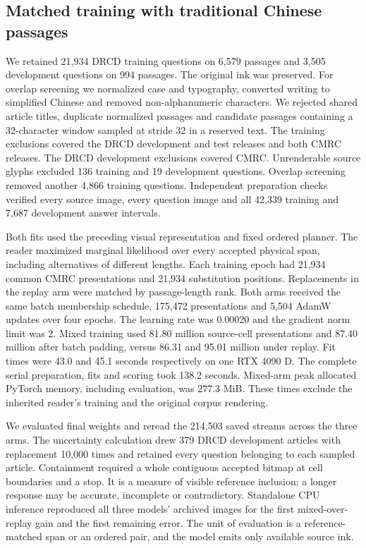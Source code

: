 \documentclass[12pt,a4paper]{article}
\providecommand{\DIFadd}[1]{{\protect\color{blue} \sf #1}} %
\begin{document}
\subsection*{\DIFadd{Matched training with traditional Chinese passages}}
\DIFadd{We retained 21,934 DRCD training questions on 6,579 passages and 3,505 development questions on 994 passages. The original ink was preserved. For overlap screening we normalized case and typography, converted writing to simplified Chinese and removed non-alphanumeric characters. We rejected shared article titles, duplicate normalized passages and candidate passages containing a 32-character window sampled at stride 32 in a reserved text. The training exclusions covered the DRCD development and test releases and both CMRC releases. The DRCD development exclusions covered CMRC. Unrenderable source glyphs excluded 136 training and 19 development questions. Overlap screening removed another 4,866 training questions. Independent preparation checks verified every source image, every question image and all 42,339 training and 7,687 development answer intervals.
}

\DIFadd{Both fits used the preceding visual representation and fixed ordered planner. The reader maximized marginal likelihood over every accepted physical span, including alternatives of different lengths. Each training epoch had 21,934 common CMRC presentations and 21,934 substitution positions. Replacements in the replay arm were matched by passage-length rank. Both arms received the same batch membership schedule, 175,472 presentations and 5,504 AdamW updates over four epochs. The learning rate was 0.00020 and the gradient norm limit was 2. Mixed training used 81.80 million source-cell presentations and 87.40 million after batch padding, versus 86.31 and 95.01 million under replay. Fit times were 43.0 and 45.1 seconds respectively on one RTX 4090 D. The complete serial preparation, fits and scoring took 138.2 seconds. Mixed-arm peak allocated PyTorch memory, including evaluation, was 277.3 MiB. These times exclude the inherited reader's training and the original corpus rendering.
}

\DIFadd{We evaluated final weights and reread the 214,503 saved streams across the three arms. The uncertainty calculation drew 379 DRCD development articles with replacement 10,000 times and retained every question belonging to each sampled article. Containment required a whole contiguous accepted bitmap at cell boundaries and a stop. It is a measure of visible reference inclusion; a longer response may be accurate, incomplete or contradictory. Standalone CPU inference reproduced all three models' archived images for the first mixed-over-replay gain and the first remaining error. The unit of evaluation is a reference-matched span or an ordered pair, and the model emits only available source ink.
}
\end{document}
